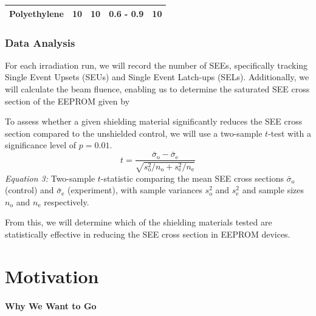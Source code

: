 \documentclass{article}
\begin{document}
\begin{table}[h]
\begin{tabular}{@{}lllll@{}}
\multicolumn{1}{l}{Polyethylene}           & \multicolumn{1}{l}{10}                                                               & \multicolumn{1}{l}{10}                       & \multicolumn{1}{l}{0.6 - 0.9}                                                               & \multicolumn{1}{l}{10}                                                                       \\ \bottomrule
\end{tabular}
\end{table}

\section*{Data Analysis}

For each irradiation run, we will record the number of SEEs, specifically tracking Single Event Upsets (SEUs) and Single Event Latch-ups (SELs). 
Additionally, we will calculate the beam fluence, enabling us to determine the saturated SEE cross section of the EEPROM given by 

To assess whether a given shielding material significantly reduces the SEE cross section compared to the unshielded control, we will use a two-sample $t$-test with a significance level of $p = 0.01$.
\begin{equation}
t = \frac{\bar{\sigma}_{\mathrm{o}} - \bar{\sigma}_{\mathrm{e}}}{\sqrt{{s_{\mathrm{o}}^2}/{n_{\mathrm{o}} + {s_{\mathrm{e}}^2}/{n_{\mathrm{e}}}}}} \tag{3}
\end{equation}
\noindent
\textit{Equation 3:} Two-sample $t$-statistic comparing the mean SEE cross sections $\bar{\sigma}_{\mathrm{o}}$ (control) and $\bar{\sigma}_{\mathrm{e}}$ (experiment), with sample variances $s_{\mathrm{o}}^2$ and $s_{\mathrm{e}}^2$ and sample sizes $n_{\mathrm{o}}$ and $n_{\mathrm{e}}$ respectively.

From this, we will determine which of the shielding materials tested are statistically effective in reducing the SEE cross section in EEPROM devices.

\newpage
\vspace*{-5.5em}

\part{Motivation}

\subsection*{Why We Want to Go}
\end{document}
